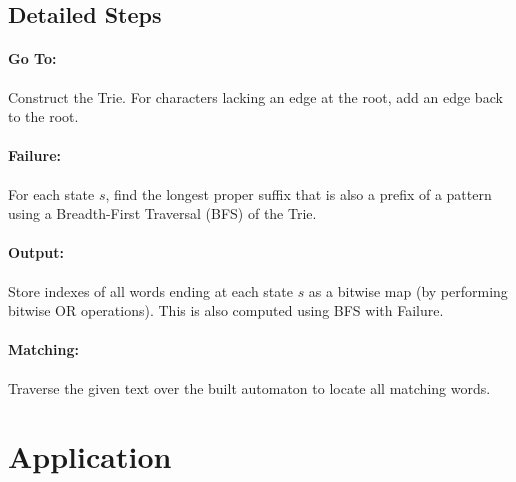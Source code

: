 \documentclass[11pt,a4paper]{article}
\begin{document}
\subsection*{Detailed Steps}

\paragraph{Go To:}  
Construct the Trie. For characters lacking an edge at the root, add an edge back to the root.

\paragraph{Failure:}  
For each state $s$, find the longest proper suffix that is also a prefix of a pattern using a Breadth-First Traversal (BFS) of the Trie.

\paragraph{Output:}  
Store indexes of all words ending at each state $s$ as a bitwise map (by performing bitwise OR operations). This is also computed using BFS with Failure.

\paragraph{Matching:}  
Traverse the given text over the built automaton to locate all matching words.
\\

\section{Application}
\end{document}
